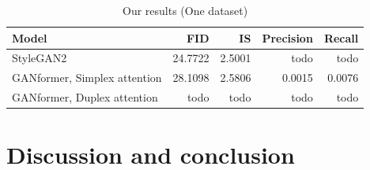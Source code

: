 \documentclass{article}
\begin{document}
    \begin{table}[htb]
    	\centering
		\caption{Our results (One dataset)}
		\label{tab:our-results}
		\vspace{3mm}
		\small
		\begin{tabular}{l|rrrr}
			\toprule
			Model                        & FID   & IS & Precision  & Recall \\ 
			\midrule
			StyleGAN2                    & 24.7722 & 2.5001 & todo        & todo      \\ 
			GANformer, Simplex attention & 28.1098 & 2.5806 & 0.0015      & 0.0076    \\ 
			GANformer, Duplex attention  & todo    & todo   & todo        & todo      \\ 
			\bottomrule
		\end{tabular}
	\end{table}

	
	
	
	\clearpage
	
	\section{Discussion and conclusion}%
	
	
	\clearpage %
	
	
	\clearpage
	
\end{document}
